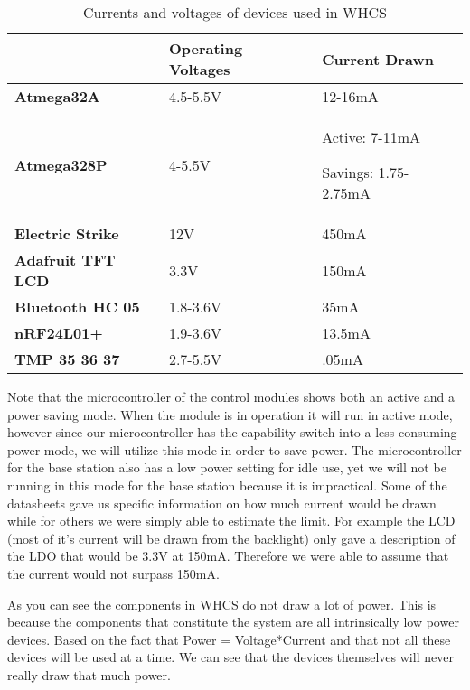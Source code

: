 \begin{table}[H]
\begin{tabular}{|l|l|l|}
\hline
 &
{\color{black} \textbf{Operating Voltages}} &
{\color{black} \textbf{Current Drawn}}\\\hline
{\color{black} \textbf{Atmega32A}} &
{\color{black} 4.5-5.5V } &
{\color{black} 12-16mA}\\\hline
{\color{black} \textbf{Atmega328P}} &
{\color{black} 4-5.5V} &
{\color{black} Active: 7-11mA }

{\color{black} Savings: 1.75-2.75mA}\\\hline
{\color{black} \textbf{Electric Strike }} &
{\color{black} 12V} &
{\color{black} 450mA}\\\hline
{\color{black} \textbf{Adafruit TFT LCD}} &
{\color{black} 3.3V} &
{\color{black} 150mA}\\\hline
{\color{black} \textbf{Bluetooth HC 05}} &
{\color{black} 1.8-3.6V} &
{\color{black} 35mA}\\\hline
{\color{black} \textbf{nRF24L01+}} &
{\color{black} 1.9-3.6V}

 &
{\color{black} 13.5mA}\\\hline
{\color{black} \textbf{TMP 35 36 37 }} &
{\color{black} 2.7-5.5V} &
{\color{black} .05mA}\\\hline
\end{tabular}
\caption{Currents and voltages of devices used in WHCS}
\label{tab:pwr-current}
\end{table}

Note that the microcontroller of the control modules shows both an active and a
power saving mode. When the module is in operation it will run in active mode,
however since our microcontroller has the capability switch into a less
consuming power mode, we will utilize this mode in order to save power. The
microcontroller for the base station also has a low power setting for idle use,
yet we will not be running in this mode for the base station because it is
impractical. Some of the datasheets gave us specific information on how much
current would be drawn while for others we were simply able to estimate the
limit. For example the LCD (most of it{}'s current will be drawn from the
backlight) only gave a description of the LDO that would be 3.3V at 150mA.
Therefore we were able to assume that the current would not surpass 150mA.

As you can see the components in WHCS do not draw a lot of power. This is
because the components that constitute the system are all intrinsically low power
devices.  Based on the fact that Power = Voltage*Current and that not all these
devices will be used at a time. We can see that the devices themselves will
never really draw that much power.

